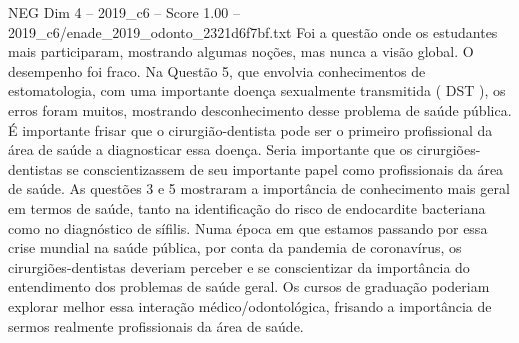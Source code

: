 \begin{textsample}{NEG Dim 4 – 2019\_c6 – Score 1.00 – 2019\_c6/enade\_2019\_odonto\_2321d6f7bf.txt}
Foi a questão onde os estudantes mais participaram, mostrando algumas noções, mas nunca a visão global.
O desempenho foi fraco.
Na Questão 5, que envolvia conhecimentos de estomatologia, com uma importante doença sexualmente transmitida ( DST ), os erros foram muitos, mostrando desconhecimento desse problema de saúde pública.
É importante frisar que o cirurgião-dentista pode ser o primeiro profissional da área de saúde a diagnosticar essa doença.
Seria importante que os cirurgiões-dentistas se conscientizassem de seu importante papel como profissionais da área de saúde.
As questões 3 e 5 mostraram a importância de conhecimento mais geral em termos de saúde, tanto na identificação do risco de endocardite bacteriana como no diagnóstico de sífilis.
Numa época em que estamos passando por essa crise mundial na saúde pública, por conta da pandemia de coronavírus, os cirurgiões-dentistas deveriam perceber e se conscientizar da importância do entendimento dos problemas de saúde geral.
Os cursos de graduação poderiam explorar melhor essa interação médico/odontológica, frisando a importância de sermos realmente profissionais da área de saúde.

\end{textsample}
